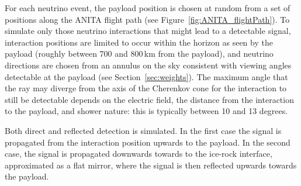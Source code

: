 For each neutrino event, the payload position is chosen at random from a set of positions along the ANITA flight path (see Figure~\ref{fig:ANITA_flightPath}).
To simulate only those neutrino interactions that might lead to a detectable signal, interaction positions are limited to occur within the horizon as seen by the payload (roughly between 700 and 800\,km from the payload), and neutrino directions are chosen from an annulus on the sky consistent with viewing angles detectable at the payload (see Section~\ref{sec:weights}). 
The maximum angle that the ray may diverge from the axis of the Cherenkov cone for the interaction to still be detectable depends on the electric field, the distance from the interaction to the payload, and shower nature: this is typically between 10 and 13 degrees.

Both direct and reflected detection is simulated.
In the first case the signal is propagated from the interaction position upwards to the payload. In the second case, the signal is propagated downwards
towards to the ice-rock interface, approximated as a flat mirror,
where the signal is then reflected upwards towards the payload. 




